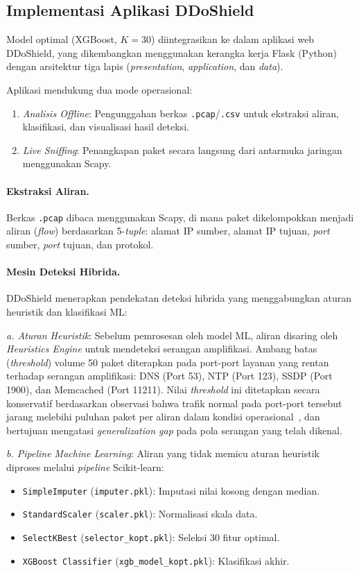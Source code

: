 \documentclass[conference,a4paper]{IEEEtran}
\begin{document}
\subsection{Implementasi Aplikasi DDoShield}

Model optimal (XGBoost, $K=30$) diintegrasikan ke dalam aplikasi web DDoShield, yang dikembangkan menggunakan kerangka kerja Flask (Python) dengan arsitektur tiga lapis (\textit{presentation}, \textit{application}, dan \textit{data}).

Aplikasi mendukung dua mode operasional:
\begin{enumerate}
    \item \textit{Analisis Offline}: Pengunggahan berkas \texttt{.pcap}/\texttt{.csv} untuk ekstraksi aliran, klasifikasi, dan visualisasi hasil deteksi.
    \item \textit{Live Sniffing}: Penangkapan paket secara langsung dari antarmuka jaringan menggunakan Scapy.
\end{enumerate}

\paragraph{Ekstraksi Aliran.}
Berkas \texttt{.pcap} dibaca menggunakan Scapy, di mana paket dikelompokkan menjadi aliran (\textit{flow}) berdasarkan 5-\textit{tuple}: alamat IP sumber, alamat IP tujuan, \textit{port} sumber, \textit{port} tujuan, dan protokol.

\paragraph{Mesin Deteksi Hibrida.}
DDoShield menerapkan pendekatan deteksi hibrida yang menggabungkan aturan heuristik dan klasifikasi ML:

\textit{a. Aturan Heuristik}: Sebelum pemrosesan oleh model ML, aliran disaring oleh \textit{Heuristics Engine} untuk mendeteksi serangan amplifikasi. Ambang batas (\textit{threshold}) volume 50 paket diterapkan pada port-port layanan yang rentan terhadap serangan amplifikasi: DNS (Port 53), NTP (Port 123), SSDP (Port 1900), dan Memcached (Port 11211). Nilai \textit{threshold} ini ditetapkan secara konservatif berdasarkan observasi bahwa trafik normal pada port-port tersebut jarang melebihi puluhan paket per aliran dalam kondisi operasional~\cite{ref_sahoo2020}, dan bertujuan mengatasi \textit{generalization gap} pada pola serangan yang telah dikenal.

\textit{b. Pipeline Machine Learning}: Aliran yang tidak memicu aturan heuristik diproses melalui \textit{pipeline} Scikit-learn:
\begin{itemize}
    \item \texttt{SimpleImputer} (\texttt{imputer.pkl}): Imputasi nilai kosong dengan median.
    \item \texttt{StandardScaler} (\texttt{scaler.pkl}): Normalisasi skala data.
    \item \texttt{SelectKBest} (\texttt{selector\_kopt.pkl}): Seleksi 30 fitur optimal.
    \item \texttt{XGBoost Classifier} (\texttt{xgb\_model\_kopt.pkl}): Klasifikasi akhir.
\end{itemize}
\end{document}
